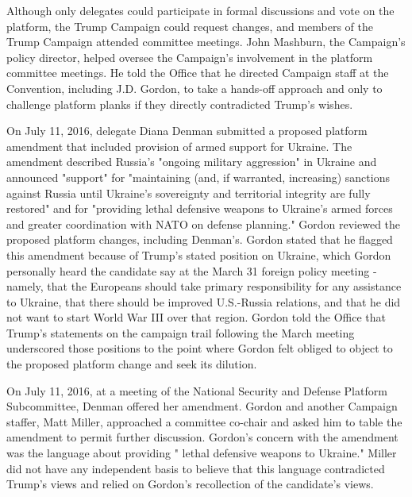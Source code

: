 Although only delegates could participate in formal discussions and vote on the platform, the Trump Campaign could request changes, and members of the Trump Campaign attended committee meetings.%
John Mashburn, the Campaign's policy director, helped oversee the Campaign's involvement in the platform committee meetings.%
He told the Office that he directed Campaign staff at the Convention, including J.D. Gordon, to take a hands-off approach and only to challenge platform planks if they directly contradicted Trump's wishes.%

On July 11, 2016, delegate Diana Denman submitted a proposed platform amendment that included provision of armed support for Ukraine.%
The amendment described Russia's "ongoing military aggression" in Ukraine and announced "support" for "maintaining (and, if warranted, increasing) sanctions against Russia until Ukraine's sovereignty and territorial integrity are fully restored" and for "providing lethal defensive weapons to Ukraine's armed forces and greater coordination with NATO on defense planning."%
Gordon reviewed the proposed platform changes, including Denman's.%
Gordon stated that he flagged this amendment because of Trump's stated position on Ukraine, which Gordon personally heard the candidate say at the March 31 foreign policy meeting - namely, that the Europeans should take primary responsibility for any assistance to Ukraine, that there should be improved U.S.-Russia relations, and that he did not want to start World War III over that region.%
Gordon told the Office that Trump's statements on the campaign trail following the March meeting underscored those positions to the point where Gordon felt obliged to object to the proposed platform change and seek its dilution.%

On July 11, 2016, at a meeting of the National Security and Defense Platform Subcommittee, Denman offered her amendment.%
Gordon and another Campaign staffer, Matt Miller, approached a committee co-chair and asked him to table the amendment to permit further discussion.%
Gordon's concern with the amendment was the language about providing " lethal defensive weapons to Ukraine."%
Miller did not have any independent basis to believe that this language contradicted Trump's views and relied on Gordon's recollection of the candidate's views.%

